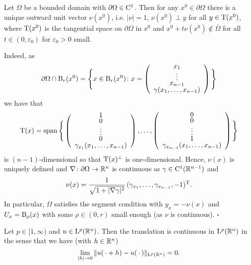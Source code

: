 \begin{rem}
  Let $\Omega$ be a bounded domain with $\partial \Omega \in \mathrm{C}^1$.
  Then for any $x^0\in \partial\Omega$ there is a unique outward unit vector $\nu(x^0)$, i.e. $|\nu| = 1$, $\nu(x^0) \perp y$ for all $y \in \mathrm{T}(x^0)$, where $\mathrm{T}(x^0)$ is the tangential space on $\partial\Omega$ in $x^0$ and $x^0 + t\nu(x^0) \not\in\overline\Omega$ for all $t \in (0,\varepsilon_0)$ for $\varepsilon_0 > 0$ small.

  Indeed, as 
  $$
  \def\arraystretch{0.6}
  \partial\Omega \cap \BB_r(x^0) = \Bigg\{ x \in \BB_r(x^0) \colon x = \left( \begin{array}{c} x_1 \\ \vdots \\ x_{n - 1} \\ \gamma(x_1,\dots,x_{n-1}) \end{array} \right) \Bigg\} 
  $$
  we have that
  $$
  \def\arraystretch{0.6}
  \TT(x) = \Span \Bigg\{ 
    \left(\begin{array}{c} 1 \\ 0 \\ \vdots \\ 0 \\ \gamma_{x_1}(x_1,\dots,x_{n - 1}) \end{array} \right),
    \dots, 
    \left(\begin{array}{c} 0 \\ 0 \\ \vdots \\ 1 \\ \gamma_{x_{n-1}}(x_1,\dots,x_{n - 1}) \end{array} \right)\Bigg\}
  $$
  is $(n-1)$-dimensional so that $\mathrm{T}(x)^\perp$ is one-dimensional.
  Hence, $\nu(x)$ is uniquely defined and $\nabla \colon \partial\Omega \to \mathbb{R}^n$ is continuous as $\gamma \in \mathrm{C}^1(\mathbb{R}^{n - 1})$ and 
  $$
  \nu(x) = \frac{1}{\sqrt{1 + |\nabla \gamma|^2}} \, (\gamma_{x_1},\dots,\gamma_{x_{n - 1}}, -1)^{\mathrm{T}}.
  $$
  In particular, $\Omega$ satisfies the segment condition with $y_x = -\nu(x)$ and $U_x = \mathrm{B}_\rho(x)$ with some $\rho \in (0,r)$ small enough (as $\nu$ is continuous). \hfill$\square$
\end{rem}

\begin{prop}\label{prop:continuousTrans}
  Let $p \in [1,\infty)$ and $u \in \mathrm{L}^p(\mathbb{R}^n)$. 
    Then the translation is continuous in $\mathrm{L}^p(\mathbb{R}^n)$ in the sense that we have (with $h \in \mathbb{R}^n$)
    $$
    \lim_{|h| \to 0} \| u(\,\cdot + h) - u(\,\cdot\,)\|_{\mathrm{L}^p(\mathbb{R}^n)} = 0.
    $$
\end{prop}

